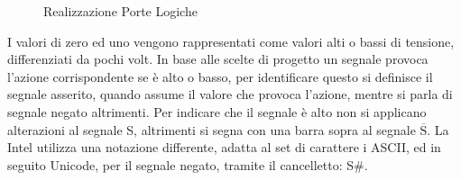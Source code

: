 \documentclass{article}
\numberwithin{equation}{subsection}
\begin{document}
\begin{figure}[H]%
    \centering%
    \qquad%
    \qquad%
    \caption{Realizzazione Porte Logiche}%
\end{figure}


I valori di zero ed uno vengono rappresentati come valori alti o bassi di tensione, differenziati da pochi volt. In base alle scelte di progetto un segnale provoca l'azione corrispondente se è alto o basso, per 
identificare questo si definisce il segnale asserito, quando assume il valore che provoca l'azione, mentre si parla di segnale negato altrimenti. 
Per indicare che il segnale è alto non si applicano alterazioni al segnale S, altrimenti si segna con una barra sopra al segnale $\overline{\mathrm{S}}$. La Intel utilizza una notazione differente, adatta al 
set di carattere i ASCII, ed in seguito Unicode, per il segnale negato, tramite il cancelletto: S\#.  
\end{document}
